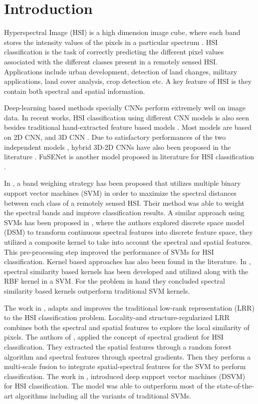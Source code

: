 \documentclass[journal]{IEEEtran}
\begin{document}
\IEEEpeerreviewmaketitle

\section{Introduction}
 Hyperspectral Image (HSI) is a high dimension image cube, where each band stores the intensity values of the pixels in a particular spectrum \cite{AMIGO20203}. HSI classification is the task of correctly predicting the different pixel values associated with the different classes present in a remotely sensed HSI. Applications include urban development, detection of land changes, military applications, land cover analysis, crop detection etc. A key feature of HSI is they contain both spectral and spatial information. 


Deep-learning based methods specially CNNs perform extremely well on image data. In recent works, HSI classification using different CNN models is also seen besides traditional hand-extracted feature based models \cite{8697135}. Most models are based on 2D CNN, and 3D CNN \cite{8340197}. Due to satisfactory performances of the two independent models \cite{9200676}, hybrid 3D-2D CNNs have also been proposed in the literature \cite{HAN202038}. FuSENet is another model proposed in literature for HSI classification \cite{iet:/content/journals/10.1049/iet-ipr.2019.1462}.

In \cite{7465721}, a band weighing strategy has been proposed that utilizes multiple binary support vector machines (SVM) in order to maximize the spectral distances between each class of a remotely sensed HSI. Their method was able to weight the spectral bands and improve classification results. A similar approach using SVMs has been proposed in \cite{7831354}, where the authors explored discrete space model (DSM) to transform continuous spectral features into discrete feature space, they utilized a composite kernel to take into account the spectral and spatial features. This pre-processing step improved the performance of SVMs for HSI classification. Kernel based approaches has also been found in the literature. In \cite{wang2020spectral}, spectral similarity based kernels has been developed and utilized along with the RBF kernel in a SVM. For the problem in hand they concluded spectral similarity based kernels outperform traditional SVM kernels. 

The work in \cite{8447427}, adapts and improves the traditional low-rank representation (LRR) to the HSI classification problem. Locality-and structure-regularized LRR combines both the spectral and spatial features to explore the local similarity of pixels. The authors of \cite{CHUNHUI201861}, applied the concept of spectral gradient for HSI classification. They extracted the spatial features through a random forest algorithm and spectral features through spectral gradients. Then they perform a multi-scale fusion to integrate spatial-spectral features for the SVM to perform classification. The work in \cite{OKWUASHI2020107298}, introduced deep support vector machines (DSVM) for HSI classification. The model was able to outperform most of the state-of-the-art algorithms including all the variants of traditional SVMs. 
\end{document}
